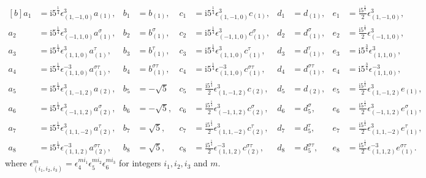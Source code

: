 \documentclass[11pt]{amsart}
\begin{document}
{\small $$\begin{aligned}[b]
		a_1 & = \mathrm{i} 5^{\frac{1}{4}} \epsilon^3_{(1,-1,0)}a_{(1)},
		&	b_1 & =b_{(1)},
		& c_1 &= \mathrm{i} 5^{\frac{1}{4}} \epsilon^3_{(1,-1,0)}c_{(1)},
		&	d_1  &= d_{(1)},
		&  e_1 & =  \frac{\mathrm{i} 5^{\frac{1}{4}}}{2} \epsilon^3_{(1,-1,0)},  \\
		a_2 &=\mathrm{i} 5^{\frac{1}{4}}  \epsilon^3_{(-1, 1,0)}a_{(1)}^{\sigma},
		&	b_2  & = b_{(1)}^{\sigma},
		&	c_2 & =\mathrm{i} 5^{\frac{1}{4}} \epsilon^3_{(-1, 1,0)}c_{(1)}^{\sigma},
		&	d_2 &  =  d_{(1)}^{\sigma},
		&	e_2 & = \frac{\mathrm{i} 5^{\frac{1}{4}}}{2}\epsilon^3_{(-1, 1,0)},\\
		a_3 & = \mathrm{i} 5^{\frac{1}{4}}\epsilon^3_{(1, 1,0)}a_{(1)}^{\tau},
		& b_3 &  = b_{(1)}^{\tau},
		& c_3  &= \mathrm{i} 5^{\frac{1}{4}} \epsilon^3_{(1, 1,0)}c_{(1)}^{\tau},
		& d_3  & =  d_{(1)}^{\tau},
		& e_3  &= \mathrm{i} 5^{\frac{3}{4}}
		\epsilon^3_{(1, 1,0)},  \\
		a_4 & = \mathrm{i} 5^{\frac{1}{4}} \epsilon^{-3}_{(1, 1,0)}a_{(1)}^{\sigma\tau},
		&	b_4  & =  b_{(1)}^{\sigma\tau},
		&	c_4 & = \mathrm{i} 5^{\frac{1}{4}} \epsilon^{-3}_{(1, 1,0)}c_{(1)}^{\sigma\tau},
		&	d_4   &  = d_{(1)}^{\sigma\tau},
		&	e_4  &  = \mathrm{i} 5^{\frac{3}{4}}
		\epsilon^{-3}_{(1, 1,0)},\\
		a_5 & = \mathrm{i} 5^{\frac{1}{4}} \epsilon^3_{(1,-1,2)}a_{(2)},
		&	b_5  & =  -\sqrt{5}
		&	c_5 & = \frac{\mathrm{i} 5^{\frac{1}{4}}}{2} \epsilon^3_{(1,-1,2)}c_{(2)},
		&	d_5  &= d_{(2)},
		&	e_5 &  = \frac{\mathrm{i} 5^{\frac{1}{4}}}{2} \epsilon^3_{(1 ,-1,2)}e_{(1)},\\
		a_6 & = \mathrm{i} 5^{\frac{1}{4}} \epsilon^3_{(-1, 1,2)}a_{(2)}^{\sigma},
		& b_6 &  =  - \sqrt{5},
		& c_6 & =  \frac{\mathrm{i} 5^{\frac{1}{4}}}{2}  \epsilon^3_{(-1, 1,2)}c_{(2)}^{\sigma},
		& d_6 & = d_5^{\sigma},
		& e_6 &  =\frac{\mathrm{i} 5^{\frac{1}{4}}}{2}  \epsilon^3_{(-1, 1,2)}e_{(1)}^{\sigma},\\
		a_7  &=\mathrm{i} 5^{\frac{1}{4}} \epsilon^3_{(1, 1,-2)}a_{(2)}^{\tau},
		& b_7 &  =   \sqrt{5},
		& c_7 & = \frac{\mathrm{i} 5^{\frac{1}{4}}}{2}  \epsilon^3_{(1,1, -2)}c_{(2)}^{\tau},
		& d_7 &=d_5^{\tau},
		& e_7 & = \frac{\mathrm{i} 5^{\frac{1}{4}}}{2}  \epsilon^3_{(1,1,-2)}e_{(1)}^{\tau},\\
		a_8  &= \mathrm{i} 5^{\frac{1}{4}} \epsilon^{-3}_{(1,1,2)}a_{(2)}^{\sigma\tau},
		& b_8 &  =   \sqrt{5},
		& c_8 & = \frac{\mathrm{i} 5^{\frac{1}{4}}}{2}  \epsilon^{-3}_{(1,1,2)}c_{(2)}^{\sigma\tau},
		& d_8& = d_5^{\sigma\tau},
		& e_8  & = \frac{\mathrm{i} 5^{\frac{1}{4}}}{2}  \epsilon^{-3}_{(1,1,2)}e_{(1)}^{\sigma\tau}.
	\end{aligned}$$}
where $\epsilon^m_{(i_1, i_2, i_3)}=\epsilon_4^{m i_1}\epsilon_5^{m i_2}\epsilon_6^{m i_3}$
for  integers $ i_1, i_2, i_3$ and $m$.
\end{document}
